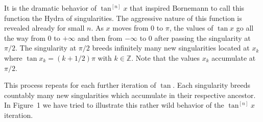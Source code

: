 \documentclass{amsart}
\theoremstyle{plain}
\numberwithin{equation}{section}
\newcommand{\Z}{{\mathbb  Z}}
\begin{document}
It is the dramatic behavior of $\tan^{[n]}x$ that inspired Bornemann to call this function the Hydra of singularities. The aggressive nature of this function is revealed already for small $n$. As $x$ moves from $0$ to $\pi$, the values of $\tan x$ go all the way from $0$ to $+\infty$ and then from $-\infty$ to $0$ after passing the singularity at $\pi/2$. The singularity at $\pi/2$ breeds infinitely many new singularities located at $x_k$ where $\tan x_k = (k+1/2) \pi$ with $k \in \Z$. Note that the values $x_k$ accumulate at $\pi/2$. 

This process repeats for each further iteration of $\tan$. Each singularity breeds countably many new singularities which accumulate in their respective ancestor. In Figure~1 we have tried to illustrate this rather wild behavior of the $\tan^{[n]}x$ iteration.
\end{document}
